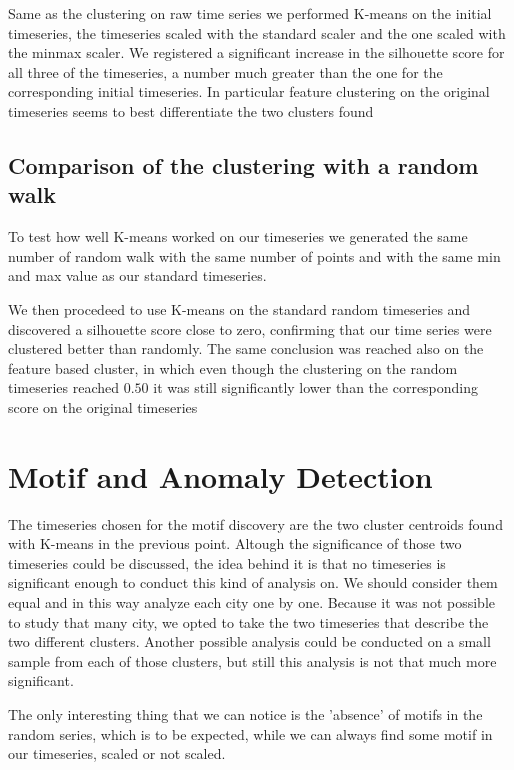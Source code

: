 Same as the clustering on raw time series we performed K-means on the initial timeseries, the timeseries scaled with the standard scaler and the one scaled with the minmax scaler.
We registered a significant increase in the silhouette score for all three of the timeseries, a number much greater than the one for the corresponding initial timeseries.
In particular feature clustering on the original timeseries seems to best differentiate the two clusters found





\subsection{Comparison of the clustering with a random walk}

To test how well K-means worked on our timeseries we generated the same number of random walk with the same number of points and with the same min and max value as our standard timeseries.

We then procedeed to use K-means on the standard random timeseries and discovered a silhouette score close to zero, confirming that our time series were clustered better than randomly.
The same conclusion was reached also on the feature based cluster, in which even though the clustering on the random timeseries reached $0.50$ it was still significantly lower than the corresponding score on the original timeseries




\section{Motif and Anomaly Detection}

The timeseries chosen for the motif discovery are the two cluster centroids found with K-means in the previous point.
Altough the significance of those two timeseries could be discussed, the idea behind it is that no timeseries is significant enough to conduct this kind of analysis on.
We should consider them equal and in this way analyze each city one by one.
Because it was not possible to study that many city, we opted to take the two timeseries that describe the two different clusters.
Another possible analysis could be conducted on a small sample from each of those clusters, but still this analysis is not that much more significant.

The only interesting thing that we can notice is the 'absence' of motifs in the random series, which is to be expected, while we can always find some motif in our timeseries, scaled or not scaled.

